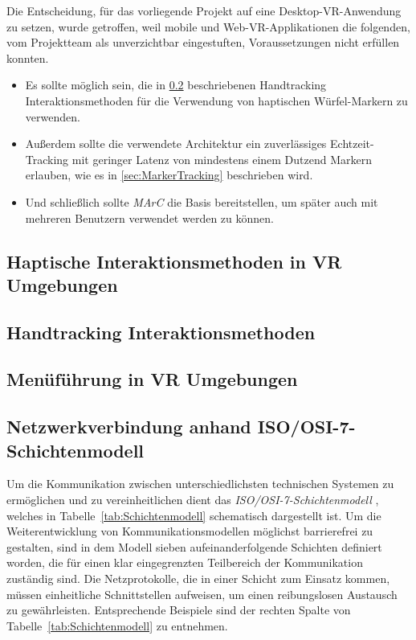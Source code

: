 Die Entscheidung, für das vorliegende Projekt auf eine Desktop-VR-Anwendung zu setzen, wurde getroffen, weil mobile und Web-VR-Applikationen die folgenden, vom Projektteam als unverzichtbar eingestuften, Voraussetzungen nicht erfüllen konnten.
\begin{itemize}
	\item Es sollte möglich sein, die in \ref{sec:HandtrackingAnwendungen} beschriebenen Handtracking Interaktionsmethoden für die Verwendung von haptischen Würfel-Markern zu verwenden.
	\item Außerdem sollte die verwendete Architektur ein zuverlässiges Echtzeit-Tracking mit geringer Latenz von mindestens einem Dutzend Markern erlauben, wie es in \ref{sec:MarkerTracking} beschrieben wird.
	\item Und schließlich sollte \emph{MArC} die Basis bereitstellen, um später auch mit mehreren Benutzern verwendet werden zu können.
\end{itemize}

\subsection{Haptische Interaktionsmethoden in VR Umgebungen}\label{sec:HaptikAnwendungen}
\subsection{Handtracking Interaktionsmethoden}\label{sec:HandtrackingAnwendungen}
\subsection{Menüführung in VR Umgebungen}\label{sec:MenüAnwendungen}
\subsection{Netzwerkverbindung anhand ISO/OSI-7-Schichtenmodell}\label{sec:Netzwerk}
Um die Kommunikation zwischen unterschiedlichsten technischen Systemen zu ermöglichen und zu vereinheitlichen dient das \textit{ISO/OSI-7-Schichtenmodell} \cite{ITU}, welches in Tabelle~\ref{tab:Schichtenmodell} schematisch dargestellt ist. Um die Weiterentwicklung von Kommunikationsmodellen möglichst barrierefrei zu gestalten, sind in dem Modell sieben aufeinanderfolgende Schichten definiert worden, die für einen klar eingegrenzten Teilbereich der Kommunikation zuständig sind. Die Netzprotokolle, die in einer Schicht zum Einsatz kommen, müssen einheitliche Schnittstellen aufweisen, um einen reibungslosen Austausch zu gewährleisten. Entsprechende Beispiele sind der rechten Spalte von Tabelle~\ref{tab:Schichtenmodell} zu entnehmen.\\

